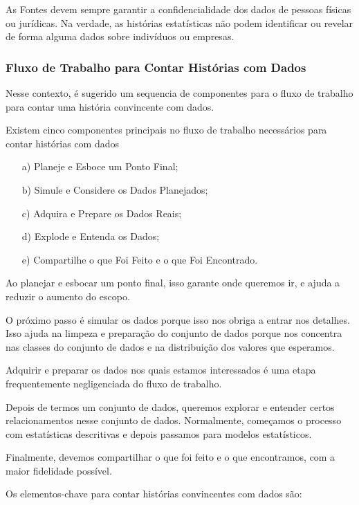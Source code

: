  As Fontes devem sempre garantir a confidencialidade dos dados de pessoas físicas ou jurídicas. Na verdade, as histórias estatísticas não podem identificar ou revelar de forma alguma dados sobre indivíduos ou empresas.\vskip0.3cm 

\subsubsection{Fluxo de Trabalho para Contar Histórias com Dados}

Nesse contexto, é sugerido um sequencia de componentes para o fluxo de trabalho para contar uma história convincente com dados.\vskip0.3cm

Existem cinco componentes principais no fluxo de trabalho necessários para contar histórias com dados

\begin{itemize}
\item[{a)}] Planeje e Esboce um Ponto Final;
\item[{b)}] Simule e Considere os Dados Planejados;
\item[{c)}] Adquira e Prepare os Dados Reais;
\item[{d)}] Explode e Entenda os Dados;
\item[{e)}] Compartilhe o que Foi Feito e o que Foi Encontrado.
\end{itemize}

Ao planejar e esbocar um ponto final, isso garante onde queremos ir, e ajuda a reduzir o aumento do escopo.\vskip0.3cm

O próximo passo é simular os dados porque isso nos obriga a entrar nos detalhes. Isso ajuda na limpeza e preparação do conjunto de dados porque nos concentra nas classes do conjunto de dados e na distribuição dos valores que esperamos.\vskip0.3cm

Adquirir e preparar os dados nos quais estamos interessados ​​é uma etapa frequentemente negligenciada do fluxo de trabalho. \vskip0.3cm

Depois de termos um conjunto de dados, queremos explorar e entender certos relacionamentos nesse conjunto de dados. Normalmente, começamos o processo com estatísticas descritivas e depois passamos para modelos estatísticos.\vskip0.3cm

Finalmente, devemos compartilhar o que foi feito e o que encontramos, com a maior fidelidade possível.\vskip0.3cm


Os elementos-chave para contar histórias convincentes com dados são:


